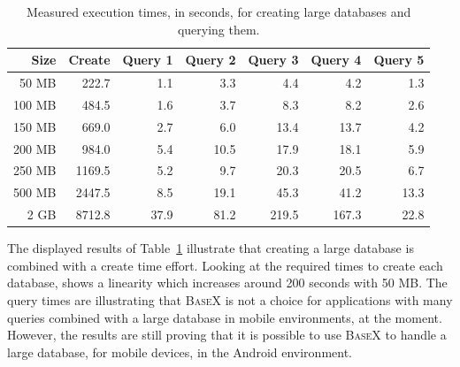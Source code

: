 \begin {table}[htpb] 
  \centering
\begin {tabular} {|r|r|r|r|r|r|r|}
	\hline
	Size&Create&Query 1&Query 2&Query 3&Query 4&Query 5\\
	\hline
	50 MB&222.7&1.1&3.3&4.4&4.2&1.3\\
       100 MB&484.5&1.6&3.7&8.3&8.2&2.6\\
       150 MB&669.0&2.7&6.0&13.4&13.7&4.2\\
       200 MB&984.0&5.4&10.5&17.9&18.1&5.9\\
       250 MB&1169.5&5.2&9.7&20.3&20.5&6.7\\
       500 MB&2447.5&8.5&19.1&45.3&41.2&13.3\\
       \hline
       \hline
       2 GB& 8712.8&37.9&81.2&219.5&167.3&22.8\\
	\hline
\end {tabular}
\caption {Measured execution times, in seconds, for creating large databases and querying them.}
\label {tab:basex-constraints}
\end {table}
The displayed results of Table~\ref{tab:basex-constraints} illustrate that creating a large database is combined with a create time effort. 
Looking at the required times to create each database, shows a linearity which increases around 200 seconds with 50 MB.
The query times are illustrating that \textsc{BaseX} is not a choice for applications with many queries combined with a large database in mobile environments, at the moment.
However, the results are still proving that it is possible to use \textsc{BaseX} to handle a large database, for mobile devices, in the Android environment.
